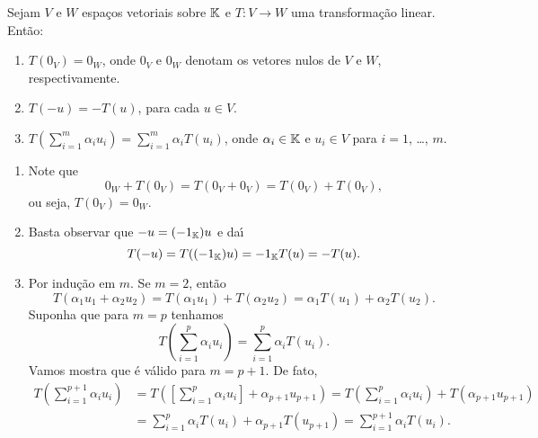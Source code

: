 \begin{lema}
	Sejam $V$ e $W$ espa\c{c}os vetoriais sobre $\mathbb{K}$ e $T : V \to W$ uma transforma\c{c}\~ao linear. Ent\~ao:
	\begin{enumerate}[label={\roman*})]\label{transformacao_linear_propriedades_basicas}
		\item $T(0_V) = 0_W$, onde $0_V$ e $0_W$ denotam os vetores nulos de $V$ e $W$, respectivamente.

		\item $T(-u) = -T(u)$, para cada $u \in V$.

		\item $T(\sum_{i=1}^m\alpha_iu_i) = \sum_{i=1}^m \alpha_i T(u_i)$, onde $\alpha_i \in \mathbb{K}$ e $u_i \in V$ para $i = 1$, \dots, $m$.
	\end{enumerate}
\end{lema}
\begin{prova}
	\begin{enumerate}[label={\roman*})]
		\item Note que
		\[
			0_W + T(0_V) = T(0_V + 0_V) = T(0_V) + T(0_V),
		\]
		ou seja, $T(0_V) = 0_W$.

		\item Basta observar que $-u = (-1_{\mathbb{K}})u$ e da{\'\i}
		\[
			T(-u) = T((-1_{\mathbb{K}})u) = -1_{\mathbb{K}}T(u) = -T(u).
		\]

		\item Por indu\c{c}\~ao em $m$. Se $m = 2$, ent\~ao
		\[
			T(\alpha_1u_1 + \alpha_2u_2) = T(\alpha_1u_1) + T(\alpha_2u_2) = \alpha_1T(u_1) + \alpha_2T(u_2).
		\]
		Suponha que para $m = p$ tenhamos
		\[
			T(\sum_{i=1}^p\alpha_iu_i) = \sum_{i=1}^p\alpha_iT(u_i).
		\]
		Vamos mostra que \'e v\'alido para $m = p + 1$. De fato,
		\begin{align*}
			T(\sum_{i=1}^{p+1}\alpha_iu_i) &= T([\sum_{i=1}^p\alpha_iu_i] + \alpha_{p + 1}u_{p + 1}) = T(\sum_{i=1}^p\alpha_iu_i) + T(\alpha_{p+1}u_{p+1}) \\ &= \sum_{i=1}^p\alpha_iT(u_i) + \alpha_{p+1}T(u_{p+1}) = \sum_{i=1}^{p+1}\alpha_iT(u_i).
		\end{align*}
	\end{enumerate}
\end{prova}

